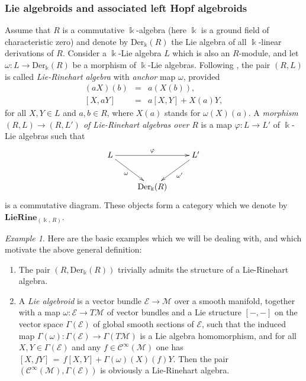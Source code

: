 \documentclass[reqno, a4paper, 10pt]{amsart}
\numberwithin{equation}{section}
\theoremstyle{plain}
\theoremstyle{definition}
\theoremstyle{remark}
\newtheorem{example}[theorem]{Example}
\begin{document}
\subsubsection{Lie algebroids and associated left Hopf algebroids}
\label{ssection: Lie alg}
Assume that $R$ is a commutative $\Bbbk$-algebra (here $\Bbbk$ is a ground field of characteristic zero) 
and denote by $\mathrm{Der}_{\Bbbk}(R)$ the Lie algebra of all $\Bbbk$-linear derivations of $R$. 
Consider a $\Bbbk$-Lie algebra $L$ which is also an $R$-module, 
and let $\omega: L \to \mathrm{Der}_{\Bbbk}(R)$ be a morphism of $\Bbbk$-Lie algebras. 
Following \cite{Rin:DFOGCA}, the pair $(R,L)$ is called \emph{Lie-Rinehart algebra} with \emph{anchor} map $\omega$, provided
\begin{eqnarray*}
 (aX) (b) &=&  a(X(b)), \qquad  \\
{[ X, aY ]} &=& a{[X,Y]}+X(a)Y,
\end{eqnarray*}
for all $X, Y \in L$ and $a, b \in R$, where $X(a)$ stands for $\omega(X)(a)$.
A \emph{morphism $(R,L) \to (R,L')$ of Lie-Rinehart algebras over $R$} is a map $\varphi: L \to L'$ of  $\Bbbk$-Lie algebras such that 
$$
\xymatrix{ L \ar@{->}_-{\omega}[rd]  \ar@{->}^-{\varphi}[rr] & & L' \ar@{->}^-{\omega'}[ld] \\ & \mathrm{Der}_{\Bbbk}(R) & }
$$
is a commutative diagram. These objects form a category which we denote by $\mathbf{LieRine}_{(\Bbbk,\,R)}$.

\begin{example}
\label{Exam: bundles}
Here are the basic examples which we will be dealing with, and which motivate the above general definition:
\begin{enumerate}
\item The pair $(R, \mathrm{Der}_{\Bbbk}(R))$ trivially admits the structure of a Lie-Rinehart algebra. 
\item A \emph{Lie algebroid}  is a  vector bundle $\mathcal{E} \to \mathcal{M}$ over a smooth manifold, together with a map $\omega: \mathcal{E} \to T\mathcal{M}$ of vector bundles and a Lie structure $[-,-]$ on the  vector space  $\Gamma({{\mathcal E}})$  of global smooth sections of $\mathcal{E}$, such that the induced map $\Gamma(\omega): \Gamma({{\mathcal E}}) \to \Gamma(T\mathcal{M})$ is a Lie algebra homomorphism, and for all $X, Y \in \Gamma({{\mathcal E}})$ and any $f \in \mathcal{C}^{\infty}(\mathcal{M})$  one has $[X,fY]\,=\, f[X,Y]+ \Gamma(\omega)(X)(f)Y$.  Then the pair $(\mathcal{C}^{\infty}(\mathcal{M}), \Gamma({{\mathcal E}}))$ is obviously a Lie-Rinehart algebra.
\end{enumerate} 
\end{example}
\end{document}
